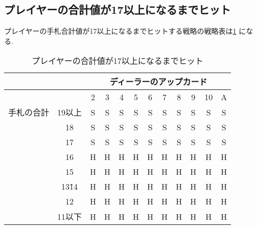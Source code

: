 \subsection{プレイヤーの合計値が17以上になるまでヒット}
プレイヤーの手札合計値が17以上になるまでヒットする戦略の戦略表は\ref{hitleq17}
になる.
\begin{table}[htbp]
  \centering
  \caption{プレイヤーの合計値が17以上になるまでヒット\label{hitleq17}}
  \begin{tabular}{|c|c|c|c|c|c|c|c|c|c|c|c|}
    \hline
    \multicolumn{2}{|c|}{} & \multicolumn{10}{|c|}{ディーラーのアップカード} \\ \hline
    \multicolumn{2}{|c|}{} & 2 & 3 & 4 & 5 & 6 & 7 & 8 & 9 & 10 & A \\ \hline
    手札の合計 & 19以上 & S & S & S & S & S & S & S & S & S & S \\ \cline{3-12}
              & 18 & S & S & S & S & S & S & S & S & S & S \\ \cline{3-12}
              & 17 & S & S & S & S & S & S & S & S & S & S \\ \cline{3-12}
              & 16 & H & H & H & H & H & H & H & H & H & H \\ \cline{3-12}
              & 15 & H & H & H & H & H & H & H & H & H & H \\ \cline{3-12}
              & 13\~ 14 & H & H & H & H & H & H & H & H & H & H \\ \cline{3-12}
              & 12 & H & H & H & H & H & H & H & H & H & H \\ \cline{3-12}
              & 11以下 & H & H & H & H & H & H & H & H & H & H \\ \hline
  \end{tabular}
\end{table}


